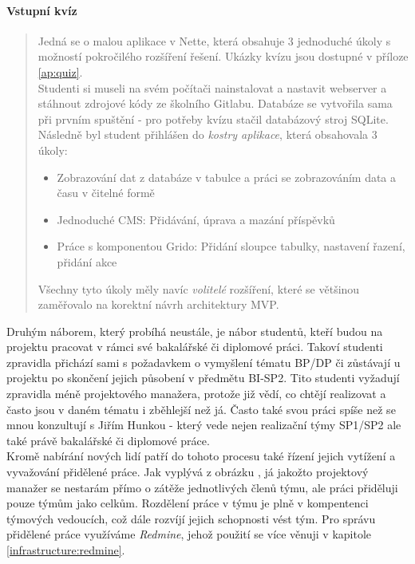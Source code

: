 \paragraph{Vstupní kvíz} \label{DBSmanagement:quiz}
\begin{quote}
Jedná se o malou aplikace v Nette, která obsahuje 3 jednoduché úkoly s možností pokročilého rozšíření řešení. Ukázky kvízu jsou dostupné v příloze \ref{ap:quiz}.\\
Studenti si museli na svém počítači nainstalovat a nastavit webserver a stáhnout zdrojové kódy ze školního Gitlabu. Databáze se vytvořila sama při prvním spuštění - pro potřeby kvízu stačil databázový stroj SQLite. Následně byl student přihlášen do \emph{kostry aplikace}, která obsahovala 3 úkoly:
\begin{itemize}
	\item Zobrazování dat z databáze v tabulce a práci se zobrazováním data a času v čitelné formě
	\item Jednoduché CMS: Přidávání, úprava a mazání příspěvků
	\item Práce s komponentou Grido: Přidání sloupce tabulky, nastavení řazení, přidání akce
\end{itemize}
Všechny tyto úkoly měly navíc \emph{volitelé} rozšíření, které se většinou zaměřovalo na korektní návrh architektury MVP. 
\end{quote}

Druhým náborem, který probíhá neustále, je nábor studentů, kteří budou na projektu pracovat v rámci své bakalářské či diplomové práci. Takoví studenti zpravidla přichází sami s požadavkem o vymyšlení tématu BP/DP či zůstávají u projektu po skončení jejich působení v předmětu BI-SP2. Tito studenti vyžadují zpravidla méně  projektového manažera, protože již vědí, co chtějí realizovat a často jsou v daném tématu i zběhlejší než já. Často také svou práci spíše než se mnou konzultují s Jiřím Hunkou - který vede nejen realizační týmy SP1/SP2 ale také právě bakalářské či diplomové práce.\\

Kromě nabírání nových lidí patří do tohoto procesu také řízení jejich vytížení a vyvažování přidělené práce. Jak vyplývá z obrázku , já jakožto projektový manažer se nestarám přímo o zátěže jednotlivých členů týmu, ale práci přiděluji pouze týmům jako celkům. Rozdělení práce v týmu je plně v kompentenci týmových vedoucích, což dále rozvíjí jejich schopnosti vést tým. Pro správu přidělené práce využíváme \emph{Redmine}, jehož použití se více věnuji v kapitole \ref{infrastructure:redmine}.


